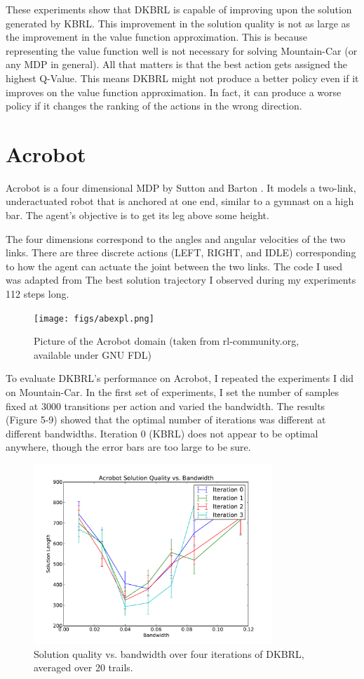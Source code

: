 These experiments show that DKBRL is capable of improving upon the solution
generated by KBRL.
This improvement in the solution quality is not as large as the improvement in the
value function approximation.
This is because representing the value function well is not necessary for
solving Mountain-Car (or any MDP in general).
All that matters is that the best action gets assigned the highest Q-Value.
This means DKBRL might not produce a better policy even if it improves on
the value function approximation.
In fact, it can produce a worse policy if it changes the ranking of the actions
in the wrong direction.

\section{Acrobot}
Acrobot is a four dimensional MDP by Sutton and Barton \cite{rlai}.
It models a two-link, underactuated robot that is anchored at one end,
similar to a gymnast on a high bar.
The agent's objective is to get its leg above some height.

The four dimensions correspond to the angles and angular velocities of the two
links.
There are three discrete actions (LEFT, RIGHT, and IDLE) corresponding to
how the agent can actuate the joint between the two links.
The code I used was adapted from \cite{rlglue}
The best solution trajectory I observed during my experiments 112 steps long.

\begin{figure}[!!!ht]
  \centering
    \texttt{[image: figs/abexpl.png]}
  \caption[Acrobot domain]{Picture of the Acrobot domain
(taken from rl-community.org, available under GNU FDL)}
\end{figure}

To evaluate DKBRL's performance on Acrobot, I repeated the experiments I did
on Mountain-Car.
In the first set of experiments, I set the number of samples fixed at 3000
transitions per action and varied the bandwidth.
The results (Figure 5-9) showed that the optimal number of iterations was
different at different bandwidths.
Iteration 0 (KBRL) does not appear to be optimal anywhere, though the error bars
are too large to be sure.

\begin{figure}[!!!ht]
  \centering
    \includegraphics[width=90mm]{figs/chap5/acroband.pdf}
  \caption[Acrobot bandwidth sensitivity on each iteration of DKBRL]
{Solution quality vs. bandwidth over four iterations of DKBRL,
  averaged over 20 trails.}
\end{figure}

